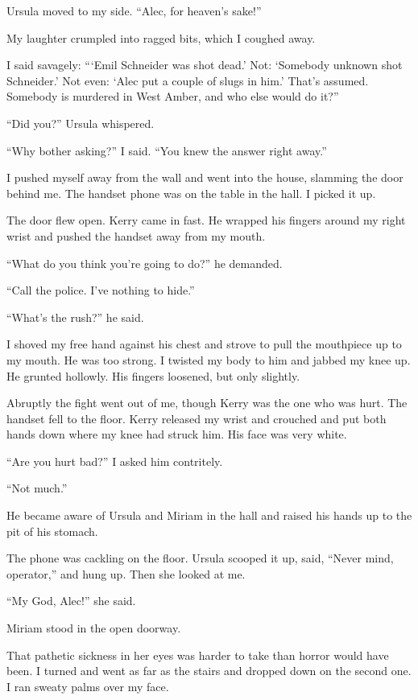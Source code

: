 \documentclass{novel}
\begin{document}
Ursula moved to my side. “Alec, for heaven’s sake!”

My laughter crumpled into ragged bits, which I coughed away.

I said savagely: “‘Emil Schneider was shot dead.’ Not: ‘Somebody unknown shot Schneider.’ Not even: ‘Alec put a couple of slugs in him.’ That’s assumed. Somebody is murdered in West Amber, and who else would do it?”

“Did you?” Ursula whispered.

“Why bother asking?” I said. “You knew the answer right away.”

I pushed myself away from the wall and went into the house, slamming the door behind me. The handset phone was on the table in the hall. I picked it up.

The door flew open. Kerry came in fast. He wrapped his fingers around my right wrist and pushed the handset away from my mouth. 

“What do you think you’re going to do?” he demanded.

“Call the police. I’ve nothing to hide.”

“What’s the rush?” he said.

I shoved my free hand against his chest and strove to pull the mouthpiece up to my mouth. He was too strong. I twisted my body to him and jabbed my knee up. He grunted hollowly. His fingers loosened, but only slightly.

Abruptly the fight went out of me, though Kerry was the one who was hurt. The handset fell to the floor. Kerry released my wrist and crouched and put both hands down where my knee had struck him. His face was very white.

“Are you hurt bad?” I asked him contritely.

“Not much.” 

He became aware of Ursula and Miriam in the hall and raised his hands up to the pit of his stomach.

The phone was cackling on the floor. Ursula scooped it up, said, “Never mind, operator,” and hung up. Then she looked at me. 

“My God, Alec!” she said.

\scenestars

Miriam stood in the open doorway.

That pathetic sickness in her eyes was harder to take than horror would have been. I turned and went as far as the stairs and dropped down on the second one. I ran sweaty palms over my face.
\end{document}
